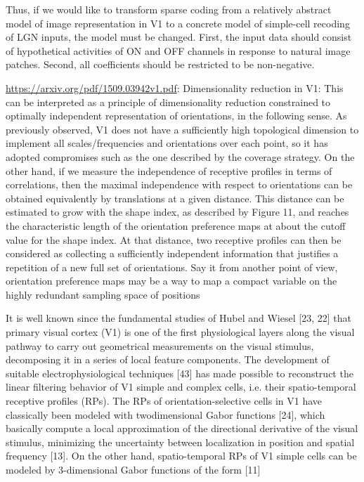 Thus, if we would like to transform sparse coding from a relatively abstract model
of image representation in \ac{V1} to a concrete model of simple-cell recoding of
\ac{LGN} inputs, the model must be changed.
First, the input data should consist of hypothetical activities of ON and OFF channels
in response to natural image patches.
Second, all coefficients should be restricted to be non-negative.

\url{https://arxiv.org/pdf/1509.03942v1.pdf}: Dimensionality reduction in V1: This can be interpreted as a principle of dimensionality reduction constrained to optimally independent representation of orientations, in the following sense. As previously observed, V1 does not have a sufficiently high topological dimension to implement all scales/frequencies and orientations over each point, so it has adopted compromises such as the one described by the coverage strategy. On the other hand, if we measure the independence of receptive profiles in terms of correlations, then the maximal independence with respect to orientations can be obtained equivalently by translations at a given distance. This distance can be estimated to grow with the shape index, as described by Figure 11, and reaches the characteristic length of the orientation preference maps at about the cutoff value for the shape index. At that distance, two receptive profiles can then be considered as collecting a sufficiently independent information that justifies a repetition of a new full set of orientations. Say it from another point of view, orientation preference maps may be a way to map a compact variable on the highly redundant sampling space of positions


It is well known since the fundamental studies of Hubel and Wiesel [23, 22] that primary
visual cortex (V1) is one of the first physiological layers along the visual pathway to
carry out geometrical measurements on the visual stimulus, decomposing it in a series of
local feature components. The development of suitable electrophysiological techniques
[43] has made possible to reconstruct the linear filtering behavior of V1 simple and
complex cells, i.e. their spatio-temporal receptive profiles (RPs).
The RPs of orientation-selective cells in V1 have classically been modeled with twodimensional
Gabor functions [24], which basically compute a local approximation of
the directional derivative of the visual stimulus, minimizing the uncertainty between
localization in position and spatial frequency [13]. On the other hand, spatio-temporal
RPs of V1 simple cells can be modeled by 3-dimensional Gabor functions of the form
[11]




